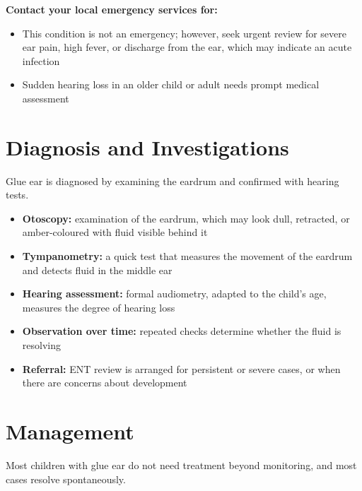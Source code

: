 \textbf{Contact your local emergency services for:}
\begin{itemize}
    \item This condition is not an emergency; however, seek urgent review for severe ear pain, high fever, or discharge from the ear, which may indicate an acute infection
    \item Sudden hearing loss in an older child or adult needs prompt medical assessment
\end{itemize}

\section*{Diagnosis and Investigations}
Glue ear is diagnosed by examining the eardrum and confirmed with hearing tests.

\begin{itemize}
    \item \textbf{Otoscopy:} examination of the eardrum, which may look dull, retracted, or amber-coloured with fluid visible behind it
    \item \textbf{Tympanometry:} a quick test that measures the movement of the eardrum and detects fluid in the middle ear
    \item \textbf{Hearing assessment:} formal audiometry, adapted to the child's age, measures the degree of hearing loss
    \item \textbf{Observation over time:} repeated checks determine whether the fluid is resolving
    \item \textbf{Referral:} ENT review is arranged for persistent or severe cases, or when there are concerns about development
\end{itemize}

\section*{Management}
Most children with glue ear do not need treatment beyond monitoring, and most cases resolve spontaneously.

